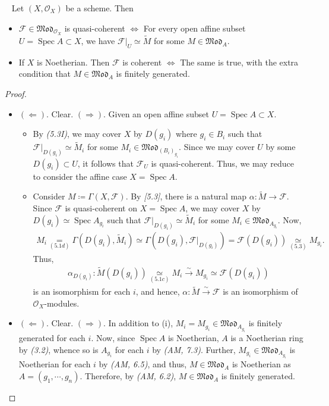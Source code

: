 \documentclass[11pt,a4paper,footinclude=true,headinclude=true]{scrbook} %
\DeclareMathOperator{\Spec}{Spec}
\newcommand{\FF}{\mathscr{F}}
\newcommand{\OO}{\mathcal{O}}
\newcommand{\<}{\langle}
\newcommand{\>}{\rangle}
\newcommand{\MOD}{\mathfrak{Mod}}
\newenvironment{proposition}[2][]
{\renewcommand\theinnercustomprop{#2}\innercustomprop[#1] 
\begin{mdframed}[backgroundcolor=gray!20]\ }
{\end{mdframed}\endinnercustomprop}
\begin{document}
\begin{proposition}{5.4}
    Let $(X,\OO_X)$ be a scheme. Then
    \begin{itemize}
        \item[(i)] $\FF\in\MOD_{\OO_X}$ is quasi-coherent $\Leftrightarrow$ For every open affine subset $U=\Spec A\subset X$,  we have $\FF|_U\simeq\widetilde{M}$ for some $M\in \MOD_A$.
        \item[(ii)] If $X$ is Noetherian. Then $\FF$ is coherent $\Leftrightarrow$ The same is true, with the extra condition that $M\in \MOD_A$ is finitely generated.
    \end{itemize}
\end{proposition}
\begin{proof}\mbox{}
    \begin{itemize}
        \item[(i)] $(\Leftarrow)$. Clear. $(\Rightarrow)$. Given an open affine subset $U=\Spec A\subset X$.
        \begin{itemize}
            \item By \textit{(5.3I)}, we may cover $X$ by $D(g_i)$ where $g_i\in B_i$ such that $\FF|_{D(g_i)}\simeq\widetilde{M}_i$ for some $M_i\in\MOD_{(B_i)_{g_i}}$. Since we may cover $U$ by some $D(g_i)\subset U$, it follows that $\FF_U$ is quasi-coherent. Thus, we may reduce to consider the affine case $X=\Spec A$.
            \item Consider $M\coloneqq\Gamma(X,\FF)$. By \textit{[5.3]}, there is a natural map $\alpha:\widetilde{M}\to\FF$. Since $\FF$ is quasi-coherent on $X=\Spec A$, we may cover $X$ by $D(g_i)\simeq\Spec A_{g_i}$ such that $\FF|_{D(g_i)}\simeq\widetilde{M}_i$ for some $M_i\in \MOD_{A_{g_i}}$. Now, 
            \begin{align*}
                M_i\underset{(5.1d)}{=}\Gamma(D(g_i),\widetilde{M}_i)\simeq\Gamma(D(g_i),\FF|_{D(g_i)})=\FF(D(g_i))\underset{(5.3)}{\simeq}M_{g_i}.
            \end{align*}
            Thus, 
            \begin{align*}
                \alpha_{D(g_i)}:\widetilde{M}(D(g_i))\underset{(5.1c)}{\simeq}M_i\xrightarrow[]{\sim}M_{g_i}\simeq\FF(D(g_i))
            \end{align*}
            is an isomorphism for each $i$, and hence, $\alpha:\widetilde{M}\xrightarrow{\sim}\FF$ is an isomorphism of $\OO_X$-modules.
        \end{itemize}
        \item[(ii)] $(\Leftarrow)$. Clear. $(\Rightarrow)$. In addition to (i), $M_i=M_{g_i}\in \MOD_{A_{g_i}}$ is finitely generated for each $i$. Now, since $\Spec A$ is Noetherian, $A$ is a Noetherian ring by \textit{(3.2)}, whence so is $A_{g_i}$ for each $i$ by \textit{(AM, 7.3)}. Further, $M_{g_i}\in \MOD_{A_{g_i}}$ is Noetherian for each $i$ by \textit{(AM, 6.5)}, and thus, $M\in \MOD_A$ is Noetherian as $A=(g_1,\cdots,g_n)$. Therefore, by \textit{(AM, 6.2)}, $M\in \MOD_A$ is finitely generated.
    \end{itemize}
\end{proof}
\end{document}
